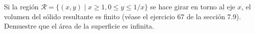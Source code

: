 \item Si la región $\mathscr{R} = \{(x, y) \mid x \ge 1, 0 \le y \le 1/x\}$ se hace girar en torno al eje $x$, el volumen del sólido resultante es finito (véase el ejercicio 67 de la sección 7.9). Demuestre que el área de la superficie es infinita.
